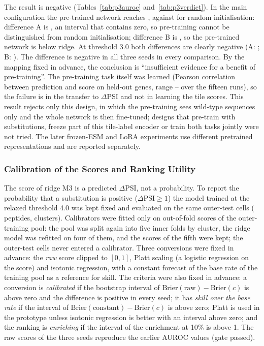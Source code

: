 The result is negative (Tables~\ref{tab:p3auroc} and~\ref{tab:p3verdict}). In the main configuration the pre-trained network reaches
\nPtExtPre{}, against \nPtExtRand{} for random initialisation: difference A is \nPtExtA{} \nPtExtACI{}, an interval that contains zero,
so pre-training cannot be distinguished from random initialisation; difference B is \nPtExtB{} \nPtExtBCI{}, so the pre-trained network
is below ridge. At threshold 3.0 both differences are clearly negative (A: \nPtBaseA{} \nPtBaseACI{}; B: \nPtBaseB{} \nPtBaseBCI{}).
The difference is negative in all three seeds in every comparison. By the mapping fixed in advance, the conclusion is
``insufficient evidence for a benefit of pre-training''. The pre-training task itself was learned (Pearson correlation
\nPtPearson{} between prediction and score on held-out genes, range \nPtPearsonLo{}--\nPtPearsonHi{} over the fifteen runs), so the failure
is in the transfer to $\Delta$PSI and not in learning the tile scores. This result rejects only this design, in which the
pre-training sees wild-type sequences only and the whole network is then fine-tuned; designs that pre-train with
substitutions, freeze part of this tile-label encoder or train both tasks jointly were not tried.
The later frozen-ESM and LoRA experiments use different pretrained representations and are reported separately.

\subsubsection{Calibration of the Scores and Ranking Utility}\label{sec:res-calibration}
The score of ridge M3 is a predicted $\Delta$PSI, not a probability. To report the probability that a substitution is positive
($\Delta\mathrm{PSI}\ge1$) the model trained at the relaxed threshold 4.0 was kept fixed and evaluated on the same \nCalNCells{}
outer-test cells (\nNPep{} peptides, \nCalNClu{} clusters). Calibrators were fitted only on out-of-fold scores of the
outer-training pool: the pool was split again into five inner folds by cluster, the ridge model was refitted on four of them,
and the scores of the fifth were kept; the outer-test cells never entered a calibrator. Three conversions were fixed in
advance: the \emph{raw} score clipped to $[0,1]$, Platt scaling (a logistic regression on the score) and isotonic regression, with a constant
forecast of the base rate of the training pool as a reference for skill. The criteria were also fixed in advance: a conversion is
\emph{calibrated} if the bootstrap interval of $\mathrm{Brier}(\text{raw})-\mathrm{Brier}(c)$ is above zero and the difference is positive in
every seed; it has \emph{skill over the base rate} if the interval of $\mathrm{Brier}(\text{constant})-\mathrm{Brier}(c)$ is above zero; Platt
is used in the prototype unless isotonic regression is better with an interval above zero; and the ranking is \emph{enriching} if the
interval of the enrichment at 10\% is above 1. The raw scores of the three seeds reproduce the earlier AUROC values (gate passed).

